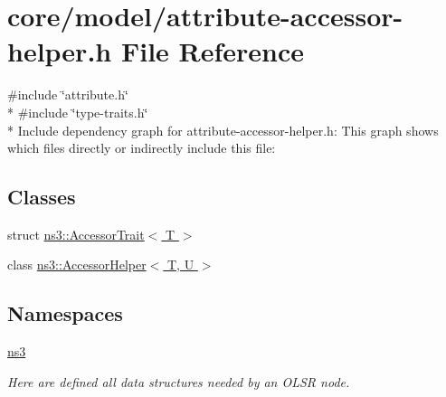 \hypertarget{attribute-accessor-helper_8h}{}\section{core/model/attribute-\/accessor-\/helper.h File Reference}
\label{attribute-accessor-helper_8h}
{\ttfamily \#include \char`\"{}attribute.\+h\char`\"{}}\\*
{\ttfamily \#include \char`\"{}type-\/traits.\+h\char`\"{}}\\*
Include dependency graph for attribute-\/accessor-\/helper.h\+:
This graph shows which files directly or indirectly include this file\+:
\subsection*{Classes}
\begin{DoxyCompactItemize}
\item 
struct \hyperlink{structns3_1_1AccessorTrait}{ns3\+::\+Accessor\+Trait$<$ T $>$}
\item 
class \hyperlink{classns3_1_1AccessorHelper}{ns3\+::\+Accessor\+Helper$<$ T, U $>$}
\end{DoxyCompactItemize}
\subsection*{Namespaces}
\begin{DoxyCompactItemize}
\item 
 \hyperlink{namespacens3}{ns3}
\begin{DoxyCompactList}\small\item\em Here are defined all data structures needed by an O\+L\+SR node. \end{DoxyCompactList}\end{DoxyCompactItemize}

